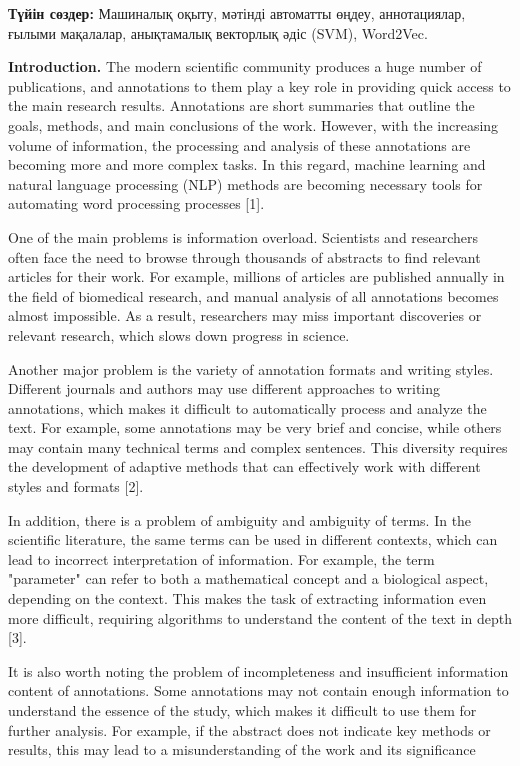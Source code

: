 {\bfseries Түйін сөздер:} Машиналық оқыту, мәтінді автоматты өңдеу,
аннотациялар, ғылыми мақалалар, анықтамалық векторлық әдіс (SVM),
Word2Vec.

\begin{multicols}{2}
{\bfseries Introduction.} The modern scientific community produces a huge
number of publications, and annotations to them play a key role in
providing quick access to the main research results. Annotations are
short summaries that outline the goals, methods, and main conclusions of
the work. However, with the increasing volume of information, the
processing and analysis of these annotations are becoming more and more
complex tasks. In this regard, machine learning and natural language
processing (NLP) methods are becoming necessary tools for automating
word processing processes {[}1{]}.

One of the main problems is information overload. Scientists and
researchers often face the need to browse through thousands of abstracts
to find relevant articles for their work. For example, millions of
articles are published annually in the field of biomedical research, and
manual analysis of all annotations becomes almost impossible. As a
result, researchers may miss important discoveries or relevant research,
which slows down progress in science.

Another major problem is the variety of annotation formats and writing
styles. Different journals and authors may use different approaches to
writing annotations, which makes it difficult to automatically process
and analyze the text. For example, some annotations may be very brief
and concise, while others may contain many technical terms and complex
sentences. This diversity requires the development of adaptive methods
that can effectively work with different styles and formats {[}2{]}.

In addition, there is a problem of ambiguity and ambiguity of terms. In
the scientific literature, the same terms can be used in different
contexts, which can lead to incorrect interpretation of information. For
example, the term "parameter" can refer to both a mathematical concept
and a biological aspect, depending on the context. This makes the task
of extracting information even more difficult, requiring algorithms to
understand the content of the text in depth {[}3{]}.

It is also worth noting the problem of incompleteness and insufficient
information content of annotations. Some annotations may not contain
enough information to understand the essence of the study, which makes
it difficult to use them for further analysis. For example, if the
abstract does not indicate key methods or results, this may lead to a
misunderstanding of the work and its significance


\end{multicols}
